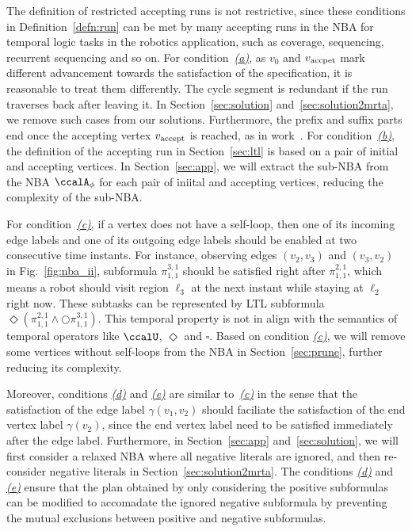 \documentclass[Afour,sageh,times]{sagej}
\newcommand{\autop}{\ccalA_{\phi}}
\newcommand{\vertex}[1]{v_{\textup{#1}}}
\renewcommand{\ap}[3]{\mathcal{\pi}_{{#1},{#2}}^{#3}}
\begin{document}
The definition of restricted accepting runs is not restrictive, since these  conditions in Definition~\ref{defn:run} can be met by many accepting runs in the NBA for temporal logic tasks in the robotics application, such as coverage, sequencing, recurrent sequencing and so on.
For condition~\hyperref[cond:a]{\it (a)}, as $v_0$ and $\vertex{accpet}$ mark different advancement towards the satisfaction of the specification, it is reasonable to treat them  differently. The cycle segment is redundant if the run traverses back after leaving it.  In Section~\ref{sec:solution} and~\ref{sec:solution2mrta}, we remove such cases from our solutions.  Furthermore, the prefix and suffix parts end once the accepting vertex $\vertex{accept}$ is reached, as in work~\cite{smith2010optimal}.
      For condition~\hyperref[cond:b]{\it (b)}, the definition of the accepting run in Section~\ref{sec:ltl} is based on a pair of initial and accepting vertices. In Section~\ref{sec:app}, we will extract the sub-NBA from the NBA $\autop$ for each pair of iniital and accepting vertices, reducing the complexity of the sub-NBA.

      For condition~\hyperref[cond:c]{\it (c)}, if a vertex does not have a self-loop, then one of its incoming edge labels  and one of its outgoing edge labels  should be enabled at two consecutive time instants. For instance, observing edges $(v_2, v_3)$ and $(v_3, v_2)$ in Fig.~\ref{fig:nba_ii}, subformula $\ap{1}{1}{3,1}$ should be satisfied right after $\ap{1}{1}{2,1}$, which means a robot  should visit region $\ell_3$ at the next instant while staying at $\ell_2$ right now. These subtasks can be represented by LTL subformula $\Diamond(\ap{1}{1}{2,1} \wedge  \bigcirc \ap{1}{1}{3,1})$. This temporal property is not in align with the semantics of temporal operators like $\ccalU$, $\Diamond$ and $\square$. Based on condition \hyperref[cond:c]{\it (c)}, we will remove some vertices without self-loops from the NBA in Section~\ref{sec:prune}, further reducing its complexity.

      Moreover, conditions \hyperref[cond:d]{\it (d)} and \hyperref[cond:e]{\it (e)} are similar to~\hyperref[cond:c]{\it (c)} in the sense that  the satisfaction of the edge label $\gamma(v_1, v_2)$ should faciliate the satisfaction of the end vertex label $\gamma(v_2)$, since the end vertex label need to be satisfied immediately after the edge label. Furthermore, in Section~\ref{sec:app} and~\ref{sec:solution}, we will first consider a relaxed NBA where all negative literals are ignored, and then re-consider negative literals in Section~\ref{sec:solution2mrta}. The conditions \hyperref[cond:d]{\it (d)} and \hyperref[cond:e]{\it (e)} ensure that the plan obtained by only considering the positive subformulas can be modified to accomadate the ignored negative subformula by preventing the mutual exclusions between positive and negative subformulas.
\end{document}
